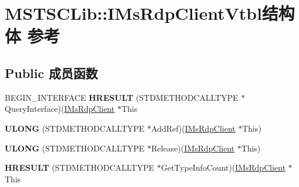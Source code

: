 \hypertarget{struct_m_s_t_s_c_lib_1_1_i_ms_rdp_client_vtbl}{}\section{M\+S\+T\+S\+C\+Lib\+:\+:I\+Ms\+Rdp\+Client\+Vtbl结构体 参考}
\label{struct_m_s_t_s_c_lib_1_1_i_ms_rdp_client_vtbl}
\subsection*{Public 成员函数}
\begin{DoxyCompactItemize}
\item 
\mbox{\label{struct_m_s_t_s_c_lib_1_1_i_ms_rdp_client_vtbl_abf002099a6c59fb85d290a0992459fd4}} 
B\+E\+G\+I\+N\+\_\+\+I\+N\+T\+E\+R\+F\+A\+CE {\bfseries H\+R\+E\+S\+U\+LT} (S\+T\+D\+M\+E\+T\+H\+O\+D\+C\+A\+L\+L\+T\+Y\+PE $\ast$Query\+Interface)(\hyperlink{interface_m_s_t_s_c_lib_1_1_i_ms_rdp_client}{I\+Ms\+Rdp\+Client} $\ast$This
\item 
\mbox{\label{struct_m_s_t_s_c_lib_1_1_i_ms_rdp_client_vtbl_acb543e586e662c5feadb5ada7289188a}} 
{\bfseries U\+L\+O\+NG} (S\+T\+D\+M\+E\+T\+H\+O\+D\+C\+A\+L\+L\+T\+Y\+PE $\ast$Add\+Ref)(\hyperlink{interface_m_s_t_s_c_lib_1_1_i_ms_rdp_client}{I\+Ms\+Rdp\+Client} $\ast$This)
\item 
\mbox{\label{struct_m_s_t_s_c_lib_1_1_i_ms_rdp_client_vtbl_a59df66e9412d229cd3730f673330fe86}} 
{\bfseries U\+L\+O\+NG} (S\+T\+D\+M\+E\+T\+H\+O\+D\+C\+A\+L\+L\+T\+Y\+PE $\ast$Release)(\hyperlink{interface_m_s_t_s_c_lib_1_1_i_ms_rdp_client}{I\+Ms\+Rdp\+Client} $\ast$This)
\item 
\mbox{\label{struct_m_s_t_s_c_lib_1_1_i_ms_rdp_client_vtbl_a299486afee63d98de7cbc4deed7b2d1e}} 
{\bfseries H\+R\+E\+S\+U\+LT} (S\+T\+D\+M\+E\+T\+H\+O\+D\+C\+A\+L\+L\+T\+Y\+PE $\ast$Get\+Type\+Info\+Count)(\hyperlink{interface_m_s_t_s_c_lib_1_1_i_ms_rdp_client}{I\+Ms\+Rdp\+Client} $\ast$This
\item 
\mbox{\label{struct_m_s_t_s_c_lib_1_1_i_ms_rdp_client_vtbl_a1d50757093cbd1a39ff74bf15b99f33a}} 

\end{DoxyCompactItemize}
